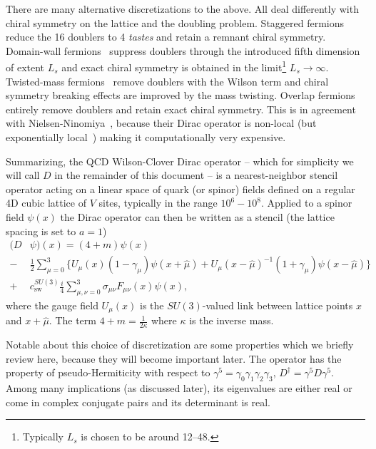 There are many alternative discretizations to the above.
All deal differently with chiral symmetry on the lattice and the doubling problem.
Staggered fermions~\cite{PhysRevD.11.395} reduce the \num{16} doublers to \num{4} \emph{tastes} and retain a remnant  chiral symmetry.
Domain-wall fermions~\cite{Kaplan:1992bt,Shamir:1993zy} suppress doublers through the introduced fifth dimension of extent $L_s$ and exact chiral symmetry is obtained in the limit\footnote{Typically $L_s$ is chosen to be around \numrange{12}{48}.} $L_s \to \infty$.
Twisted-mass fermions~\cite{Frezzotti:2000nk} remove doublers with the Wilson term and chiral symmetry breaking effects are improved by the mass twisting.
Overlap fermions~\cite{Neuberger:1997fp,Neuberger:1998wv} entirely remove doublers and retain exact chiral symmetry.
This is in agreement with Nielsen-Ninomiya~\cite{Nielsen:1980rz,Nielsen:1981xu}, because their Dirac operator is non-local (but exponentially local~\cite{Hernandez:1998et,Boyle:2016imm}) making it computationally very expensive.

Summarizing, the QCD Wilson-Clover Dirac operator -- which for simplicity we will call $D$ in the remainder of this document -- is a nearest-neighbor stencil operator acting on a linear space of quark (or spinor) fields defined on a regular 4D cubic lattice of $V$ sites, typically in the range $10^6-10^8$.
Applied to a spinor field $\psi(x)$ the Dirac operator can then be written as a stencil (the lattice spacing is set to $a = 1$)
\begin{equation}
\begin{aligned} \label{eq:Dw}
(D &\psi)(x) = (4 + m) \psi(x) \\
-&\frac{1}{2} \sum_{\mu=0}^3 \Big\{
  U_{\mu}(x) (1-\gamma_{\mu}) \psi(x + \hat{\mu})
+ U_{\mu}(x-\hat{\mu})^{-1} (1+\gamma_{\mu}) \psi(x-\hat{\mu})
\Big\} \\
+&c_\mathrm{sw}^{SU(3)} \frac{i}{4} \sum_{\mu,\nu=0}^3 \sigma_{\mu \nu} F_{\mu \nu}(x) \psi(x),
\end{aligned}
\end{equation}
where the gauge field $U_{\mu}(x)$ is the $SU(3)$-valued link between lattice points $x$ and $x + \hat{\mu}$.
The term $4+m = \frac{1}{2 \kappa}$ where $\kappa$ is the inverse mass.

Notable about this choice of discretization are some properties which we briefly review here, because they will become important later.
The operator has the property of pseudo-Hermiticity with respect to $\gamma^5 = \gamma_0 \gamma_1 \gamma_2 \gamma_3$, $D^{\dagger} = \gamma^{5} D \gamma^{5}$.
Among many implications (as discussed later), its eigenvalues are either real or come in complex conjugate pairs and its determinant is real.

